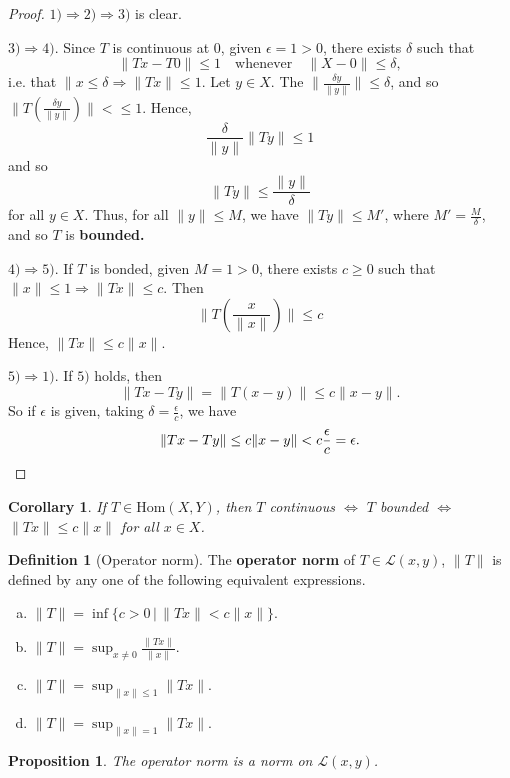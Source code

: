 \documentclass[10pt, reqno, oneside]{amsart}
\theoremstyle{plain}%
\newtheorem{prop}[thm]{Proposition}
\newtheorem*{cor}{Corollary}
\theoremstyle{definition}
\newtheorem{defn}[thm]{Definition}
\theoremstyle{remark}
\begin{document}
\begin{proof}
	$1) \Rightarrow 2) \Rightarrow 3)$ is clear.
	
	$3) \Rightarrow 4)$.  Since $T$ is continuous at 0, given $\epsilon = 1 > 0$, there exists $\delta$ such that \[
		\| Tx - T0 \| \leq 1 \quad \text{whenever} \quad \| X - 0 \| \leq \delta,
	\] i.e. that $\| x \leq \delta \Rightarrow \| Tx \| \leq 1$.  Let $y \in X$.  The $\| \frac{\delta y}{\| y \|} \| \leq \delta$, and so $\| T\left( \frac{\delta y}{\| y \|} \right) \| < \leq 1$.  Hence, \[
		\frac{\delta}{\|y \|} \|T y \| \leq 1
	\] and so \[
		\|Ty \| \leq \frac{ \| y \|}{\delta}
	\] for all $y \in X$.  Thus, for all $\| y \| \leq M$, we have $\| Ty \| \leq M'$, where $M' = \frac{M}{\delta}$, and so $T$ is \textbf{bounded.} 
	
	$4) \Rightarrow 5)$.  If $T$ is bonded, given $M = 1 > 0$, there exists $c \geq 0$ such that $\| x \| \leq 1 \Rightarrow \|T x \| \leq c$.  Then \[
		 \|T \left( \frac{x}{\|x \|} \right) \| \leq c	\] 
		Hence, $\|Tx \| \leq c \| x \|$.  
		
	$5) \Rightarrow 1)$.  If $5)$ holds, then  \[
		\| Tx - Ty \| = \| T(x-y) \| \leq c \| x - y \|.
	\]  So if $\epsilon$ is given, taking $\delta = \frac{\epsilon}{c}$, we have \[
		\|Tx - Ty \| \leq c \| x - y \| < c \frac{\epsilon}{c} = \epsilon. \qedhere
	\]
\end{proof}

\begin{cor}
	If $T \in \text{Hom}(X,Y)$, then $T$ continuous $\iff$ $T$ bounded $\iff$ $\|Tx \| \leq c \| x \|$ for all $x \in X$.
\end{cor}

\begin{defn}[Operator norm]
	The \textbf{operator norm} of $T \in \mathcal{L}(x,y)$, $\| T\|$ is defined by any one of the following equivalent expressions.
	\begin{enumerate}[(a)]
		\item $\|T \| = \inf \{ c > 0 \, | \, \| Tx \| < c \| x \| \}$.
		\item $\| T\| = \sup_{x \neq 0} \frac{ \|Tx \|}{\| x \|}$.
		\item $\| T \| = \sup_{ \|x \| \leq 1} \| Tx \|$.
		\item $\| T \| = \sup_{\| x \| = 1} \|T x \|$.
	\end{enumerate}
\end{defn}

\begin{prop}
	The operator norm is a norm on $\mathcal{L}(x,y)$.  
\end{prop}
\end{document}
